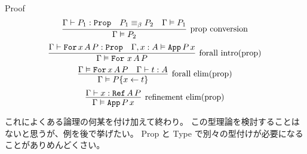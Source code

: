 \begin{itembox}[l]{Proof}
  \[\infer[\text{prop conversion}]{\Gamma \vDash P_2}{\Gamma \vdash P_1 : \texttt{Prop} & P_1 \equiv_{\beta} P_2 & \Gamma \vDash P_1} \]
  \[\infer[\text{forall intro(prop)}]{\Gamma \vDash \texttt{For} \, \, x \, A \, P}{\Gamma \vdash \texttt{For} \, x \, A \, P : \texttt{Prop} & \Gamma , x : A \vDash \texttt{App} \, P \, x} \]
  \[\infer[\text{forall elim(prop)}]{\Gamma \vDash P\{x \leftarrow t\}}{\Gamma \vDash \texttt{For} \, x \, A \, P & \Gamma \vdash t : A} \]
  \[\infer[\text{refinement elim(prop)}]{\Gamma \vDash \texttt{App} \, P \, x}{\Gamma \vdash x : \texttt{Ref} \, A \, P} \]
\end{itembox}

これによくある論理の何某を付け加えて終わり。
この型理論を検討することはないと思うが、例を後で挙げたい。
Prop と Type で別々の型付けが必要になることがありめんどくさい。